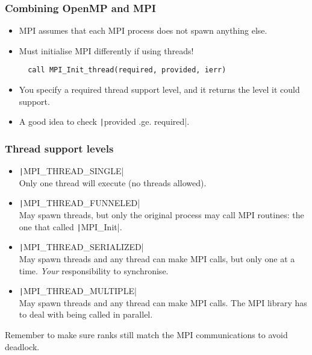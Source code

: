 \documentclass{beamer}
\begin{document}
\begin{frame}[fragile]
\frametitle{Combining OpenMP and MPI}
\begin{itemize}
  \item MPI assumes that each MPI process does not spawn anything else.
  \item Must initialise MPI differently if using threads!
  \begin{verbatim}
  call MPI_Init_thread(required, provided, ierr)
  \end{verbatim}

  \item You specify a required thread support level, and it returns the level it could support.
  \item A good idea to check \texttt|provided .ge. required|.
\end{itemize}
\end{frame}

\begin{frame}
\frametitle{Thread support levels}
\begin{itemize}
  \item \texttt|MPI_THREAD_SINGLE| \\
  Only one thread will execute (no threads allowed).

  \item \texttt|MPI_THREAD_FUNNELED| \\
  May spawn threads, but only the original process may call MPI routines: the one that called \texttt|MPI_Init|.

  \item \texttt|MPI_THREAD_SERIALIZED| \\
  May spawn threads and any thread can make MPI calls, but only one at a time. \emph{Your} responsibility to synchronise.

  \item \texttt|MPI_THREAD_MULTIPLE| \\
  May spawn threads and any thread can make MPI calls. The MPI library has to deal with being called in parallel.
\end{itemize}

Remember to make sure ranks still match the MPI communications to avoid deadlock.

\end{frame}
\end{document}
